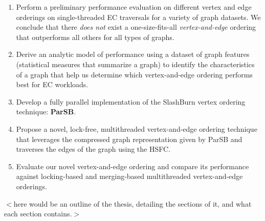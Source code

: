 \begin{enumerate}
  \item {Perform a preliminary performance evaluation on different vertex and edge orderings on single-threaded \ac{EC} traversals for a variety of graph datasets. We conclude that there \textit{does not} exist a one-size-fits-all \textit{vertex-and-edge} ordering that outperforms all others for all types of graphs.}
  \item {Derive an analytic model of performance using a dataset of graph features (statistical measures that summarize a graph) to identify the characteristics of a graph that help us determine which vertex-and-edge ordering performs best for \ac{EC} workloads.}
  \item {Develop a fully parallel implementation of the SlashBurn vertex ordering technique: \textbf{ParSB}.}
  \item {Propose a novel, lock-free, multithreaded vertex-and-edge ordering technique that leverages the compressed graph representation given by ParSB and traverses the edges of the graph using the \ac{HSFC}.}
  \item {Evaluate our novel vertex-and-edge ordering and compare its performance against locking-based and merging-based multithreaded vertex-and-edge orderings.}
\end{enumerate}

$<$here would be an outline of the thesis, detailing the sections of it, and what each section contains.$>$

